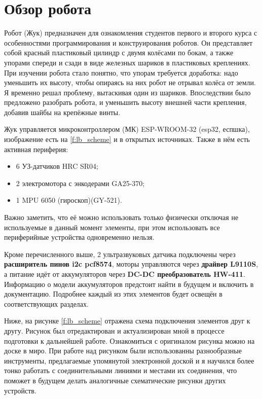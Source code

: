 \chapter{Обзор робота}
Робот (Жук) предназначен для ознакомления студентов первого и второго курса с особенностями программирования и конструирования роботов. Он представляет собой красный пластиковый цилиндр с двумя колёсами по бокам, а также упорами спереди и сзади в виде железных шариков в пластиковых креплениях. При изучении робота стало понятно, что упорам требуется доработка: надо уменьшить их высоту, чтобы опираясь на них робот не отрывал колёса от земли. Я временно решал проблему, вытаскивая один из шариков. Впоследствии было предложено разобрать робота, и уменьшить высоту внешней части крепления, добавив шайбы на крепёжные винты.

Жук управляется микроконтроллером (МК) ESP-WROOM-32 (esp32, еспшка), изображение есть на \ref{f:lb_scheme} и в открытых источниках. Также в нём есть активная периферия:
\begin{itemize}
    \item 6 УЗ-датчиков HRC SR04;
    \item 2 электромотора с энкодерами GA25-370;
    \item 1 MPU 6050 (гироскоп)(GY-521).
\end{itemize}

Важно заметить, что её можно использовать только физически отключая не используемые в данный момент элементы, при этом использовать все периферийные устройства одновременно нельзя.

Кроме перечисленного выше, 2 ультразвуковых датчика подключены через \textbf{расширитель пинов i2c pcf8574}, моторы управляются через \textbf{драйвер L9110S}, а питание идёт от аккумуляторов через \textbf{DC-DC преобразователь HW-411}. Информацию о модели аккумуляторов предстоит найти в будущем и включить в документацию. Подробнее каждый из этих элементов будет освещён в соответствующих разделах.

Ниже, на рисунке \ref{f:lb_scheme} отражена схема подключения элементов друг к другу. Рисунок был отредактирован и актуализирован мной в процессе подготовки к дальнейшей работе. Ознакомиться с оригиналом рисунка можно на доске в миро. При работе над рисунком были использованны разнообразные инструменты, предлагаемые упомянутой электронной доской и я научился более тонко работать с соединительными линиями и местами их соединения, что поможет в будущем делать аналогичные схематические рисунки других устройств.
\pagebreak[3]


